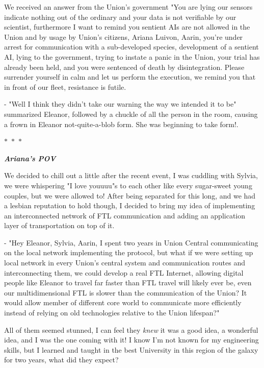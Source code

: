 \documentclass[colorlinks,12pt,a4paper]{book}
\newcommand\sep{\begin{center}
  \boldmath $\ast$~$\ast$~$\ast$
\end{center}}
\begin{document}
 We received an answer from the Union's government "You are lying our sensors indicate nothing out of the ordinary and your data is not verifiable 
 by our scientist, furthermore I want to remind you sentient AIs are not allowed in the Union and by usage by Union's citizens, Ariana Luivon, Aarin, you're under 
 arrest for communication with a sub-developed species, development of a sentient AI, lying to the government, trying to instate a panic in the Union, your 
 trial has already been held, and you were sentenced of death by disintegration. Please surrender yourself in calm and let us perform the execution, we 
 remind you that in front of our fleet, resistance is futile.\par 
 \bigskip 
 
 - "Well I think they didn't take our warning the way we intended it to be" summarized Eleanor, followed by a chuckle of all the person in 
 the room, causing a frown in Eleanor not-quite-a-blob form. She was beginning to take form!.
 
 \sep 
 \textit{\textbf{Ariana's POV}}\par 
 \bigskip
 
 We decided to chill out a little after the recent event, I was cuddling with Sylvia, we were whispering "I love youuuu"s to each other like 
 every sugar-sweet young couples, but we were allowed to! After being separated for this long, and we had a lesbian reputation to hold though, 
 I decided to bring my idea of implementing an interconnected network of FTL communication and adding an application layer of transportation 
 on top of it.\par 
 \bigskip 
 
 - "Hey Eleanor, Sylvia, Aarin, I spent two years in Union Central communicating on the local network implementing the protocol,
 but what if we were setting up local network in every Union's central system and communication routes and interconnecting them, we could
 develop a real FTL Internet, allowing digital people like Eleanor to travel far faster than FTL travel will likely ever be, even 
 our multidimensional FTL is slower than the communication of the Union? It would allow member of different core world to communicate 
 more efficiently instead of relying on old technologies relative to the Union lifespan?"\par 
 \bigskip 
 
 All of them seemed stunned, I can feel they \textit{knew} it was a good idea, a wonderful idea, and I was the one coming with it! I 
 know I'm not known for my engineering skills, but I learned and taught in the best University in this region of the galaxy for two years,
 what did they expect?\par 
 \bigskip
 
\end{document}
